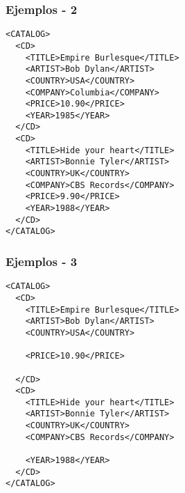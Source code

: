 \begin{frame}
\frametitle{Ejemplos - 2}
\footnotesize
\texttt{<CATALOG>				\\
	~~<CD>					\\
	~~~~<TITLE>Empire Burlesque</TITLE>	\\
	~~~~<ARTIST>Bob Dylan</ARTIST>		\\
	~~~~<COUNTRY>USA</COUNTRY>		\\
	~~~~<COMPANY>Columbia</COMPANY>		\\
	~~~~<PRICE>10.90</PRICE>		\\
	~~~~<YEAR>1985</YEAR>			\\
	~~</CD>					\\
	~~<CD>					\\
	~~~~<TITLE>Hide your heart</TITLE>	\\
	~~~~<ARTIST>Bonnie Tyler</ARTIST>	\\
	~~~~<COUNTRY>UK</COUNTRY>		\\
	~~~~<COMPANY>CBS Records</COMPANY>	\\
	~~~~<PRICE>9.90</PRICE>			\\
	~~~~<YEAR>1988</YEAR>			\\
	~~</CD>					\\
	</CATALOG>
}
\end{frame}

\begin{frame}
\frametitle{Ejemplos - 3}
\footnotesize
\texttt{<CATALOG>				\\
	~~<CD>					\\
	~~~~<TITLE>Empire Burlesque</TITLE>	\\
	~~~~<ARTIST>Bob Dylan</ARTIST>		\\
	~~~~<COUNTRY>USA</COUNTRY>		\\
	~					\\
	~~~~<PRICE>10.90</PRICE>		\\
	~					\\
	~~</CD>					\\
	~~<CD>					\\
	~~~~<TITLE>Hide your heart</TITLE>	\\
	~~~~<ARTIST>Bonnie Tyler</ARTIST>	\\
	~~~~<COUNTRY>UK</COUNTRY>		\\
	~~~~<COMPANY>CBS Records</COMPANY>	\\
	~					\\
	~~~~<YEAR>1988</YEAR>			\\
	~~</CD>					\\
	</CATALOG>
}
\end{frame}

